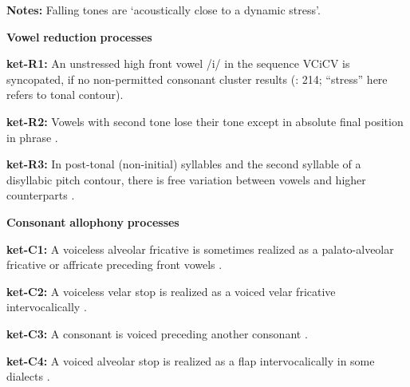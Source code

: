 \documentclass[output=paper]{langsci/langscibook}
\begin{document}
\begin{styleBody}
\textbf{Notes:} Falling tones are ‘acoustically close to a dynamic stress’.
\end{styleBody}

\begin{styleBody}
\textbf{Vowel} \textbf{reduction} \textbf{processes}
\end{styleBody}

\begin{styleBody}
\textbf{ket-R1:} An unstressed high front vowel /i/ in the sequence VCiCV is syncopated, if no non-permitted consonant cluster results (\citealt{Georg2007}: 214; “stress” here refers to tonal contour).
\end{styleBody}

\begin{styleBody}
\textbf{ket-R2:} Vowels with second tone lose their tone except in absolute final position in phrase \citep[15-16]{Vajda2000}.
\end{styleBody}

\begin{styleBody}
\textbf{ket-R3:} In post-tonal (non-initial) syllables and the second syllable of a disyllabic pitch contour, there is free variation between vowels and higher counterparts \citep[11]{Vajda2000}.
\end{styleBody}

\begin{styleBody}
\textbf{Consonant} \textbf{allophony} \textbf{processes}
\end{styleBody}

\begin{styleBody}
\textbf{ket-C1:} A voiceless alveolar fricative is sometimes realized as a palato-alveolar fricative or affricate preceding front vowels \citep[78]{Georg2007}.
\end{styleBody}

\begin{styleBody}
\textbf{ket-C2:} A voiceless velar stop is realized as a voiced velar fricative intervocalically \citep[75]{Georg2007}.
\end{styleBody}

\begin{styleBody}
\textbf{ket-C3:} A consonant is voiced preceding another consonant \citep[75]{Georg2007}.
\end{styleBody}

\begin{styleBody}
\textbf{ket-C4:} A voiced alveolar stop is realized as a flap intervocalically in some dialects \citep[76]{Georg2007}.
\end{styleBody}
\end{document}
